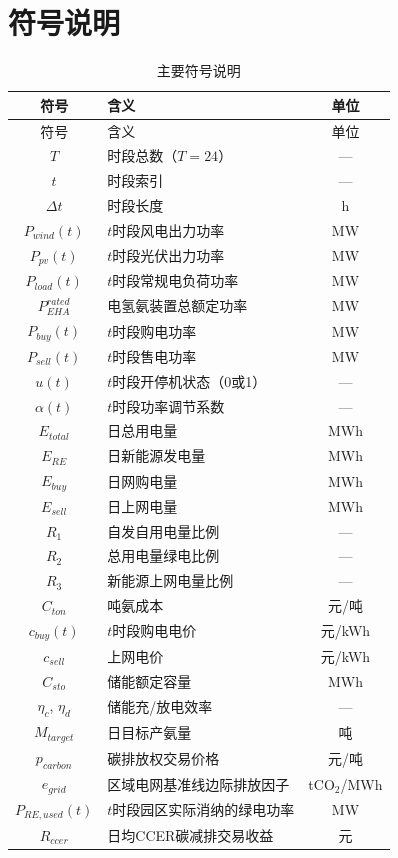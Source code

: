 \section{符号说明}

\begin{longtable}{clc}
\caption{主要符号说明}\label{tab:symbols} \\
\toprule
符号 & 含义 & 单位 \\
\midrule
\endfirsthead
\toprule
符号 & 含义 & 单位 \\
\midrule
\endhead
$T$ & 时段总数（$T=24$） & --- \\
$t$ & 时段索引 & --- \\
$\Delta t$ & 时段长度 & h \\
$P_{wind}(t)$ & $t$时段风电出力功率 & MW \\
$P_{pv}(t)$ & $t$时段光伏出力功率 & MW \\
$P_{load}(t)$ & $t$时段常规电负荷功率 & MW \\
$P_{EHA}^{rated}$ & 电氢氨装置总额定功率 & MW \\
$P_{buy}(t)$ & $t$时段购电功率 & MW \\
$P_{sell}(t)$ & $t$时段售电功率 & MW \\
$u(t)$ & $t$时段开停机状态（0或1） & --- \\
$\alpha(t)$ & $t$时段功率调节系数 & --- \\
$E_{total}$ & 日总用电量 & MWh \\
$E_{RE}$ & 日新能源发电量 & MWh \\
$E_{buy}$ & 日网购电量 & MWh \\
$E_{sell}$ & 日上网电量 & MWh \\
$R_1$ & 自发自用电量比例 & --- \\
$R_2$ & 总用电量绿电比例 & --- \\
$R_3$ & 新能源上网电量比例 & --- \\
$C_{ton}$ & 吨氨成本 & 元/吨 \\
$c_{buy}(t)$ & $t$时段购电电价 & 元/kWh \\
$c_{sell}$ & 上网电价 & 元/kWh \\
$C_{sto}$ & 储能额定容量 & MWh \\
$\eta_c$, $\eta_d$ & 储能充/放电效率 & --- \\
$M_{target}$ & 日目标产氨量 & 吨 \\
$p_{carbon}$ & 碳排放权交易价格 & 元/吨 \\
$e_{grid}$ & 区域电网基准线边际排放因子 & tCO$_2$/MWh \\
$P_{RE,used}(t)$ & $t$时段园区实际消纳的绿电功率 & MW \\
$R_{ccer}$ & 日均CCER碳减排交易收益 & 元 \\
\bottomrule
\end{longtable}
